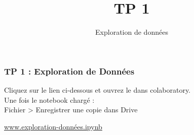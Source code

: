\documentclass{formation}
\title{TP 1}
\subtitle{Exploration de données}
\begin{document}
\maketitle

\begin{frame}
  \frametitle{TP 1 : Exploration de Données}
  Cliquez sur le lien ci-dessous et ouvrez le dans colaboratory. \\
  Une fois le notebook chargé : \\
  Fichier > Enregistrer une copie dans Drive \\
  \begin{center}
    \href{https://drive.google.com/open?id=1T-L2OM0LnY83AtkpJJfkHqvUf51GU56d}{www.exploration-données.ipynb}
  \end{center}
\end{frame}
\end{document}

